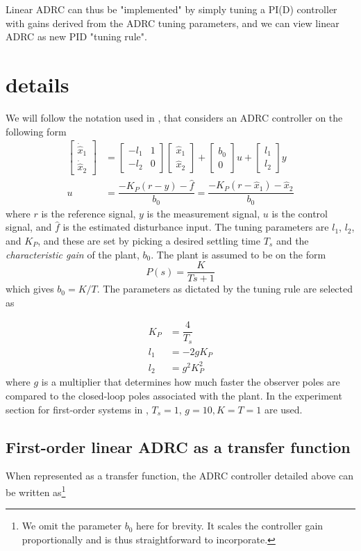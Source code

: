\documentclass[letterpaper, 10 pt, conference]{ieeeconf}
\newcommand{\bmatrixx}[1]{\begin{bmatrix}#1\end{bmatrix}}
\begin{document}
Linear ADRC can thus be "implemented" by simply tuning a PI(D) controller with gains derived from the ADRC tuning parameters, and we can view linear ADRC as new PID "tuning rule".

\section{details}
We will follow the notation used in \cite{herbst2013simulative}, that considers an ADRC controller on the following form
\begin{align}
   \bmatrixx{\dot{\hat{x}}_1 \\ \dot{\hat{x}}_2} &= 
   		\bmatrixx{-l_1 & 1 \\ -l_2 & 0} \bmatrixx{\hat{x}_1 \\ \hat{x}_2} + 
		\bmatrixx{b_0 \\ 0} u + \bmatrixx{l_1 \\ l_2} y \\
	u &= \dfrac{-K_P(r-y) - \hat{f}}{b_0} = \dfrac{-K_P(r-\hat{x}_1) - \hat{x}_2}{b_0}
\end{align}
where $r$ is the reference signal, $y$ is the measurement signal, $u$ is the control signal, and $\hat{f}$ is the estimated disturbance input. The tuning parameters are $l_1$, $l_2$, and $K_P$, and these are set by picking a desired settling time $T_s$ and the \emph{characteristic gain} of the plant, $b_0$. The plant is assumed to be on the form
$$P(s) = \dfrac{K}{Ts+1}$$
which gives $b_0 = K/T$. The parameters as dictated by the tuning rule are selected as 


\begin{align}
	K_P &= \dfrac{4}{T_s} \\
	l_1 &= -2gK_P \\
	l_2 &= g^2K_P^2
\end{align}
where $g$ is a multiplier that determines how much faster the observer poles are compared to the closed-loop poles associated with the plant. In the experiment section for first-order systems in \cite{herbst2013simulative}, $T_s = 1$, $g = 10, K = T = 1$ are used.

\subsection{First-order linear ADRC as a transfer function}
When represented as a transfer function, the ADRC controller detailed above can be written as\footnote{We omit the parameter $b_0$ here for brevity. It scales the controller gain proportionally and is thus straightforward to incorporate.}
\end{document}
